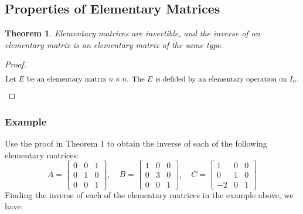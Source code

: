 \documentclass[10pt, oneside]{article}
\newtheorem{thm}{Theorem}
\begin{document}
\subsection{Properties of Elementary Matrices}
\begin{thm}
	Elementary matrices are invertible, and the inverse of an elementary matrix is an elementary matrix of the same type.
\end{thm}

\begin{proof}
	\begin{align*}
		\intertext{Let $E$ be an elementary matrix $n \times n$. The $E$ is defided by an elementary operation on $I_n$.}
	\end{align*}
\end{proof}

\subsubsection{Example}
Use the proof in Theorem 1 to obtain the inverse of each of the following elementary matrices:
\[
	A = \begin{bmatrix} 0 & 0 & 1 \\ 0 & 1 & 0 \\ 0 & 0 & 1 \end{bmatrix}, \quad
	B = \begin{bmatrix} 1 & 0 & 0 \\ 0 & 3 & 0 \\ 0 & 0 & 1 \end{bmatrix}, \quad
	C = \begin{bmatrix} 1 & 0 & 0 \\ 0 & 1 & 0 \\ -2 & 0 & 1 \end{bmatrix}
\]
Finding the inverse of each of the elementary matrices in the example above, we have:
\end{document}
